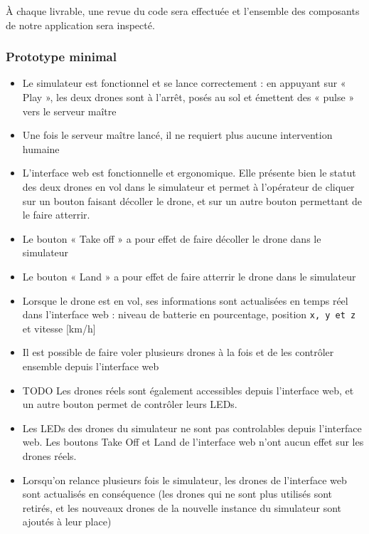 \documentclass{mistcoursedoc}
\begin{document}
À chaque livrable, une revue du code sera effectuée et l'ensemble des composants de notre application sera inspecté.
\subsubsection{Prototype minimal}
\begin{itemize}
  \item Le simulateur est fonctionnel et se lance correctement : en appuyant sur « Play », les deux drones sont à l'arrêt, posés au sol et émettent des « pulse » vers le serveur maître
  \item Une fois le serveur maître lancé, il ne requiert plus aucune intervention humaine
  \item L'interface web est fonctionnelle et ergonomique. Elle présente bien le statut des deux drones en vol dans le simulateur et permet à l'opérateur de cliquer sur un bouton faisant décoller le drone, et sur un autre bouton permettant de le faire atterrir.
  \item Le bouton « Take off » a pour effet de faire décoller le drone dans le simulateur
  \item Le bouton « Land » a pour effet de faire atterrir le drone dans le simulateur
  \item Lorsque le drone est en vol, ses informations sont actualisées en temps réel dans l'interface web : niveau de batterie en pourcentage, position \texttt{x, y et z} et vitesse [km/h]
  \item Il est possible de faire voler plusieurs drones à la fois et de les contrôler ensemble depuis l'interface web
  \item TODO Les drones réels sont également accessibles depuis l'interface web, et un autre bouton permet de contrôler leurs LEDs.
  \item Les LEDs des drones du simulateur ne sont pas controlables depuis l'interface web. Les boutons Take Off et Land de l'interface web n'ont aucun effet sur les drones réels.
  \item Lorsqu'on relance plusieurs fois le simulateur, les drones de l'interface web sont actualisés en conséquence (les drones qui ne sont plus utilisés sont retirés, et les nouveaux drones de la nouvelle instance du simulateur sont ajoutés à leur place)
\end{itemize}
\end{document}
